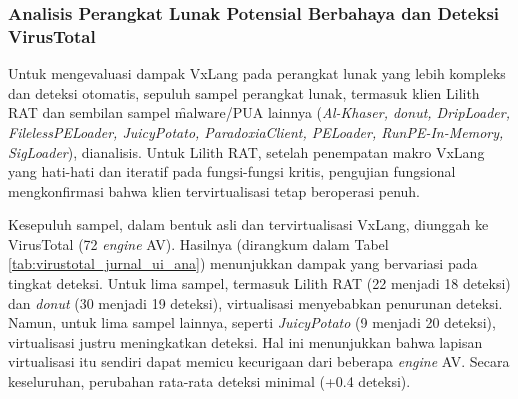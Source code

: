 \subsubsection{Analisis Perangkat Lunak Potensial Berbahaya dan Deteksi VirusTotal}
Untuk mengevaluasi dampak VxLang pada perangkat lunak yang lebih kompleks dan deteksi otomatis, sepuluh sampel perangkat lunak, termasuk klien Lilith RAT \cite{LilithRAT} dan sembilan sampel \f{malware}/PUA lainnya (\textit{Al-Khaser, donut, DripLoader, FilelessPELoader, JuicyPotato, ParadoxiaClient, PELoader, RunPE-In-Memory, SigLoader}), dianalisis. Untuk Lilith RAT, setelah penempatan makro VxLang yang hati-hati dan iteratif pada fungsi-fungsi kritis, pengujian fungsional mengkonfirmasi bahwa klien tervirtualisasi tetap beroperasi penuh.

Kesepuluh sampel, dalam bentuk asli dan tervirtualisasi VxLang, diunggah ke VirusTotal (72 \textit{engine} AV). Hasilnya (dirangkum dalam Tabel \ref{tab:virustotal_jurnal_ui_ana}) menunjukkan dampak yang bervariasi pada tingkat deteksi. Untuk lima sampel, termasuk Lilith RAT (22 menjadi 18 deteksi) dan \textit{donut} (30 menjadi 19 deteksi), virtualisasi menyebabkan penurunan deteksi. Namun, untuk lima sampel lainnya, seperti \textit{JuicyPotato} (9 menjadi 20 deteksi), virtualisasi justru meningkatkan deteksi. Hal ini menunjukkan bahwa lapisan virtualisasi itu sendiri dapat memicu kecurigaan dari beberapa \textit{engine} AV. Secara keseluruhan, perubahan rata-rata deteksi minimal (+0.4 deteksi).


